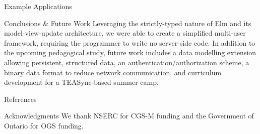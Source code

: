 \documentclass[22pt]{beamer}
\begin{document}
\begin{frame}[fragile]
\begin{textblock}{7.25}
\begin{block}{\fontsize{37}{20}\selectfont Example Applications}
            \vspace{-5mm}
        \end{block}

        \begin{block}{\fontsize{37}{20}\selectfont Conclusions \& Future Work}
            Leveraging the strictly-typed nature of Elm and its model-view-update architecture, we were able
            to create a simplified multi-user framework, requiring the programmer to write no server-side code. In addition to the upcoming pedagogical study, future work includes a data modelling extension allowing persistent, structured data, an
            authentication/authorization scheme, a binary data format to reduce network communication, and
            curriculum development for a TEASync-based summer camp.
        \end{block}


        \begin{block}{\fontsize{37}{20}\selectfont References}
            
            {\scriptsize
                }
        \end{block}

        \begin{block}{\fontsize{37}{20}\selectfont Acknowledgments}
            We thank NSERC for CGS-M funding and the Government of Ontario for OGS funding.
        \end{block}


\end{textblock}
\end{frame}
\end{document}
